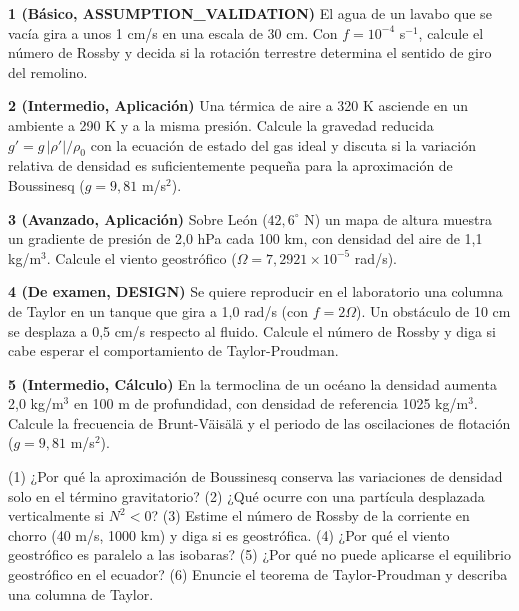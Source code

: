 \documentclass[10pt,openany]{book}
\begin{document}
\begin{tcolorbox}[title={Ejercicios propuestos}, studiumworked, breakable]

\noindent\textbf{1 (Básico, ASSUMPTION\_VALIDATION)}
El agua de un lavabo que se vacía gira a unos 1 cm/s en una escala de 30 cm. Con \(f = 10^{-4}\) s\(^{-1}\), calcule el número de Rossby y decida si la rotación terrestre determina el sentido de giro del remolino.

\noindent\textbf{2 (Intermedio, Aplicación)}
Una térmica de aire a 320 K asciende en un ambiente a 290 K y a la misma presión. Calcule la gravedad reducida \(g' = g\,|\rho'|/\rho_0\) con la ecuación de estado del gas ideal y discuta si la variación relativa de densidad es suficientemente pequeña para la aproximación de Boussinesq (\(g = 9{,}81\) m/s\(^2\)).

\noindent\textbf{3 (Avanzado, Aplicación)}
Sobre León (\(42{,}6^\circ\) N) un mapa de altura muestra un gradiente de presión de 2,0 hPa cada 100 km, con densidad del aire de 1,1 kg/m\(^3\). Calcule el viento geostrófico (\(\Omega = 7{,}2921\times 10^{-5}\) rad/s).

\noindent\textbf{4 (De examen, DESIGN)}
Se quiere reproducir en el laboratorio una columna de Taylor en un tanque que gira a 1,0 rad/s (con \(f = 2\Omega\)). Un obstáculo de 10 cm se desplaza a 0,5 cm/s respecto al fluido. Calcule el número de Rossby y diga si cabe esperar el comportamiento de Taylor-Proudman.

\noindent\textbf{5 (Intermedio, Cálculo)}
En la termoclina de un océano la densidad aumenta 2,0 kg/m\(^3\) en 100 m de profundidad, con densidad de referencia 1025 kg/m\(^3\). Calcule la frecuencia de Brunt-Väisälä y el periodo de las oscilaciones de flotación (\(g = 9{,}81\) m/s\(^2\)).
\end{tcolorbox}

\begin{tcolorbox}[title={Autoevaluación}, studiumcheck, breakable]

(1) ¿Por qué la aproximación de Boussinesq conserva las variaciones de densidad solo en el término gravitatorio? (2) ¿Qué ocurre con una partícula desplazada verticalmente si \(N^{2} < 0\)? (3) Estime el número de Rossby de la corriente en chorro (40 m/s, 1000 km) y diga si es geostrófica. (4) ¿Por qué el viento geostrófico es paralelo a las isobaras? (5) ¿Por qué no puede aplicarse el equilibrio geostrófico en el ecuador? (6) Enuncie el teorema de Taylor-Proudman y describa una columna de Taylor.
\end{tcolorbox}
\studiumchaptercheck
\end{document}
